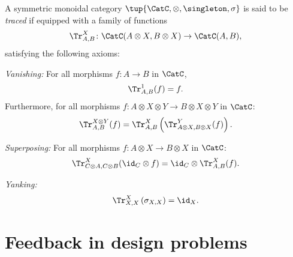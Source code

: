\begin{shaded*}
\begin{definition}
A symmetric monoidal category $\tup{\CatC, \otimes, \singleton, \sigma}$ is said to be \emph{traced} if equipped with a family of functions
\begin{equation}
    \Tr_{A,B}^X\colon \CatC(A\otimes X, B\otimes X)\to \CatC(A,B),
\end{equation}
satisfying the following axioms:
\begin{compactenum}
    \item \emph{Vanishing:} For all morphisms $f\colon A\to B$ in $\CatC$,
    \begin{equation}
    \label{eq:vanishing_1}
    \Tr_{A,B}^1(f)=f.
    \end{equation}
    Furthermore, for all morphisms $f\colon A\otimes X \otimes Y \to B\otimes X \otimes Y$ in $\CatC$:
    \begin{equation}
    \label{eq:vanishing_2}
        \Tr_{A,B}^{X\otimes Y}(f)=\Tr_{A,B}^X\left(
        \Tr_{A\otimes X,B\otimes X}^Y(f)\right).
    \end{equation}
    \item \emph{Superposing:} For all morphisms $f\colon A\otimes X\to B\otimes X$ in $\CatC$:
    \begin{equation}
    \label{eq:superposing}
        \Tr_{C\otimes A,C\otimes B}^{X}(\id_C\otimes f)=\id_C\otimes \Tr_{A,B}^X(f).
    \end{equation}
    \item \emph{Yanking:} 
    \begin{equation}
    \label{eq:yanking}
    \Tr_{X,X}^X\left(\sigma_{X,X}\right)=\id_X.
    \end{equation}
\end{compactenum}
\end{definition}
\end{shaded*}

\section{Feedback in design problems}
\label{sec:feedbackindesign}
